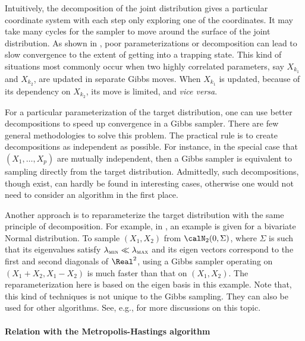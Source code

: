 Intuitively, the decomposition of the joint distribution gives a particular
coordinate system with each step only exploring one of the coordinates. It
may take many cycles for the sampler to move around the surface of the joint
distribution. As shown in \cite[][note~9.7.1]{Robert:2004tn}, poor
parameterizations or decomposition can lead to slow convergence to the extent
of getting into a trapping state. This kind of situations most commonly occur
when two highly correlated parameters, say $X_{k_1}$ and $X_{k_2}$, are
updated in separate Gibbs moves. When $X_{k_1}$ is updated, because of its
dependency on $X_{k_2}$, its move is limited, and \emph{vice versa}.

For a particular parameterization of the target distribution, one can use
better decompositions to speed up convergence in a Gibbs sampler. There are
few general methodologies to solve this problem. The practical rule is to
create decompositions as independent as possible. For instance, in the
special case that $(X_1,\dots,X_p)$ are mutually independent, then a Gibbs
sampler is equivalent to sampling directly from the target distribution.
Admittedly, such decompositions, though exist, can hardly be found in
interesting cases, otherwise one would not need to consider an \mcmc
algorithm in the first place.

Another approach is to reparameterize the target distribution with the same
principle of decomposition. For example, in
\cite[][sec.~10.4.1]{Robert:2004tn}, an example is given for a bivariate
Normal distribution. To sample $(X_1,X_2)$ from $\calN_2(0, \Sigma)$, where
$\Sigma$ is such that its eigenvalues satisfy $\lambda_{\text{\textsc{min}}}
\ll \lambda_{\text{\textsc{max}}}$ and its eigen vectors correspond to the
first and second diagonals of $\Real^2$, using a Gibbs sampler operating on
$(X_1 + X_2, X_1 - X_2)$ is much faster than that on $(X_1,X_2)$. The
reparameterization here is based on the eigen basis in this example. Note
that, this kind of techniques is not unique to the Gibbs sampling. They can
also be used for other \mcmc algorithms. See, e.g.,
\cite{Hills:1993vb,Gilks:1996vx} for more discussions on this topic.

\paragraph{Relation with the Metropolis-Hastings algorithm}


